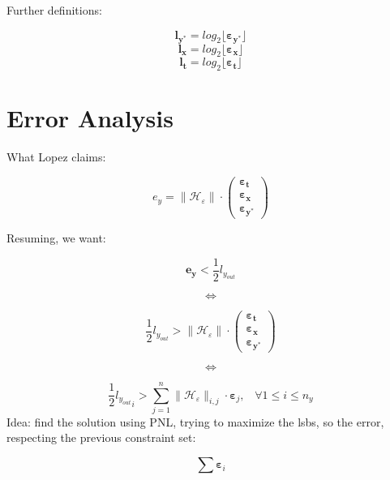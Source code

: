 \documentclass[]{article}
\theoremstyle{remark}
\numberwithin{equation}{subsection}
\newcommand{\yout}{{y_{out}}}
\newcommand{\ys}{{y^*}}
\newcommand{\dy}{{e_{y}}}
\newcommand{\dyM}{\boldsymbol{\dy}}
\newcommand{\ly}{{l_{\yout}}}
\newcommand{\lys}{\boldsymbol{l_{\ys}}}
\newcommand{\lx}{{l_x}}
\newcommand{\lt}{{l_t}}
\newcommand{\lysM}{\boldsymbol{\lys}}
\newcommand{\lxM}{\boldsymbol{\lx}}
\newcommand{\ltM}{\boldsymbol{\lt}}
\newcommand{\wcpg}{\|\mathcal{H}_{\varepsilon}\|}
\newcommand{\errVt}{\boldsymbol{\varepsilon_t}}
\newcommand{\errVx}{\boldsymbol{\varepsilon_x}}
\newcommand{\errVy}{\boldsymbol{\varepsilon_{\ys}}}
\newcommand{\errV}{\boldsymbol{\varepsilon}}
\newcommand{\errVe}{\begin{pmatrix} \errVt \\ \errVx \\ \errVy \end{pmatrix}}
\begin{document}
		Further definitions:
		
		$$ \lysM = log_2 \lfloor \errVy \rfloor$$
		$$ \lxM  = log_2 \lfloor \errVx \rfloor$$
		$$ \ltM  = log_2 \lfloor \errVt \rfloor$$

	\section{Error Analysis}
	What Lopez claims:

	$$\dy = \wcpg \cdot \errVe$$
	
	Resuming, we want:

		$$\dyM < \frac{1}{2} \ly$$

		$$\Leftrightarrow$$

		$$\frac{1}{2} \ly > \wcpg \cdot \errVe$$

		$$\Leftrightarrow$$

		$$\frac{1}{2} \ly_i > \sum_{j=1}^n \wcpg_{i,j} \cdot \errV_j, \hspace{10pt} \forall 1 \leq i \leq n_y$$
	Idea: find the solution using PNL, trying to maximize the lsbs, so the error, respecting the previous constraint set:

		$$\sum \errV_i$$
\end{document}
